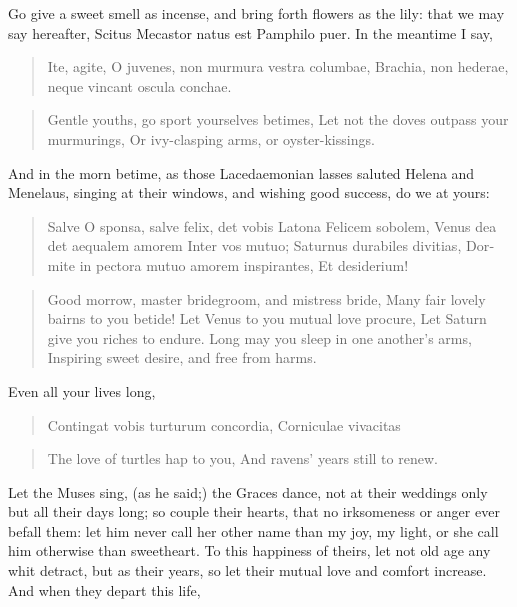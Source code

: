 Go give a sweet smell as incense, and bring forth flowers as the
lily: that we may say hereafter, Scitus Mecastor natus est Pamphilo
puer. In the meantime I say,

\begin{latin}
\begin{verse}
Ite, agite, O juvenes, non murmura vestra columbae,
Brachia, non hederae, neque vincant oscula conchae.
\end{verse}
\end{latin}
\translationrule%
\begin{verse}%
Gentle youths, go sport yourselves betimes,
Let not the doves outpass your murmurings,
Or ivy-clasping arms, or oyster-kissings.
\end{verse}%

And in the morn betime, as those Lacedaemonian lasses saluted
Helena and Menelaus, singing at their windows, and wishing good
success, do we at yours:

\begin{latin}
\begin{verse}
Salve O sponsa, salve felix, det vobis Latona
Felicem sobolem, Venus dea det aequalem amorem
Inter vos mutuo; Saturnus durabiles divitias,
Dormite in pectora mutuo amorem inspirantes,
Et desiderium!
\end{verse}
\end{latin}
\translationrule%
\begin{verse}%
Good morrow, master bridegroom, and mistress bride,
Many fair lovely bairns to you betide!
Let Venus to you mutual love procure,
Let Saturn give you riches to endure.
Long may you sleep in one another's arms,
Inspiring sweet desire, and free from harms.
\end{verse}%

Even all your lives long,

\begin{latin}
\begin{verse}
Contingat vobis turturum concordia,
Corniculae vivacitas
\end{verse}
\end{latin}
\translationrule%
\begin{verse}%
The love of turtles hap to you,
And ravens' years still to renew.
\end{verse}%

Let the Muses sing, (as he said;) the Graces dance, not at their
weddings only but all their days long; so couple their hearts, that no
irksomeness or anger ever befall them: let him never call her other
name than my joy, my light, or she call him otherwise than sweetheart.
To this happiness of theirs, let not old age any whit detract, but as
their years, so let their mutual love and comfort increase. And when
they depart this life,

